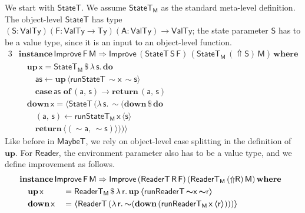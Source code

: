 \documentclass[acmsmall,screen,review,anonymous]{acmart}
\newcommand{\mit}[1]{{\mathsf{#1}}}
\newcommand{\msf}[1]{{\mathsf{#1}}}
\newcommand{\mbf}[1]{{\mathbf{#1}}}
\newcommand{\bs}[1]{\boldsymbol{#1}}
\newcommand{\mdo}{\mbf{do}\,}
\newcommand{\ind}{\hspace{1em}}
\newcommand{\return}{\mbf{return}\,}
\newcommand{\lam}{\lambda\,}
\newcommand{\where}{\mbf{where}}
\newcommand{\M}{\msf{M}}
\newcommand{\of}{\mbf{of}\,}
\newcommand{\vA}{\mathsf{A}}
\newcommand{\vS}{\mathsf{S}}
\newcommand{\vF}{\mathsf{F}}
\newcommand{\vR}{\mathsf{R}}
\newcommand{\vM}{\mathsf{M}}
\newcommand{\va}{\mathsf{a}}
\newcommand{\vx}{\mathsf{x}}
\newcommand{\vs}{\mathsf{s}}
\newcommand{\vr}{\mathsf{r}}
\newcommand{\Reader}{\msf{Reader}}
\newcommand{\ReaderT}{\msf{ReaderT}}
\newcommand{\fro}{\leftarrow}
\newcommand{\case}{\mbf{case\,}}
\newcommand{\Up}{{\Uparrow}}
\newcommand{\spl}{{\bs{\sim}}}
\newcommand{\ql}{{\bs{\langle}}}
\newcommand{\qr}{{\bs{\rangle}}}
\newcommand{\VTy}{\msf{ValTy}}
\newcommand{\Ty}{\msf{Ty}}
\newcommand{\MaybeT}{\msf{MaybeT}}
\theoremstyle{remark}
\newcommand{\mup}{\mbf{up}}
\newcommand{\mdown}{\mbf{down}}
\newcommand{\instance}{\mbf{instance}\,}
\newcommand{\Improve}{\msf{Improve}}
\newcommand{\qt}[1]{\ql#1\qr}
\newcommand{\RA}{\Rightarrow}
\newcommand{\StateT}{\msf{StateT}}
\newcommand{\runReaderT}{\mit{runReaderT}}
\newcommand{\runStateT}{\mit{runStateT}}
\newcommand{\dlr}{\,\$\,}
\begin{document}
We start with $\StateT$. We assume $\StateT_\M$ as the standard meta-level
definition. The object-level $\StateT$ has type $(\vS : \VTy)(\vF : \VTy \to
\Ty)(\vA : \VTy) \to \VTy$; the state parameter $\vS$ has to be a value type,
since it is an input to an object-level function.
\begin{alignat*}{3}
  &\instance \Improve\,\vF\,\vM \RA \Improve\,(\StateT\,\vS\,\vF)\,(\StateT_\M\,(\Up \vS)\,\vM)\,\where\\
  &\ind \mup\,\vx = \StateT_\M \dlr \lam \vs.\,\mdo\\
  &\ind\ind \mit{as} \fro \mup\,\qt{\runStateT\,\spl \vx\,\spl \vs}\\
  &\ind\ind \case \mit{as}\,\,\of (\va,\,\vs) \to \return (\va,\,\vs)\\
  &\ind \mdown\,\vx = \qt{ \StateT\,(\lam \vs.\, \spl(\mdown \dlr \mdo\\\
  &\ind \ind (\va,\,\vs) \fro \runStateT_\M\,\vx\,\qt{\vs}\\
  &\ind \ind \return \qt{(\spl \va,\, \spl \vs)}))}
\end{alignat*}
Like before in $\MaybeT$, we rely on object-level case splitting in the
definition of $\mup$. For $\Reader$, the environment parameter also has to be a
value type, and we define improvement as follows.
\begin{alignat*}{3}
  &\hspace{-5em}\mathrlap{\instance \Improve\,\vF\,\vM \RA \Improve\,(\ReaderT\,\vR\,\vF)\,(\ReaderT_\M\,(\Up \vR)\,\vM)\,\where}\\
  &\hspace{-5em}\ind \mup\,\vx   &&= \ReaderT_\M \dlr \lam \vr.\, \mup\,\qt{\runReaderT\,\spl \vx\,\spl \vr}\\
  &\hspace{-5em}\ind \mdown\,\vx &&= \qt{\ReaderT\,(\lam \vr.\,\spl(\mdown\,(\runReaderT_\M\,\vx\,\qt{\vr})))}
\end{alignat*}
\end{document}
